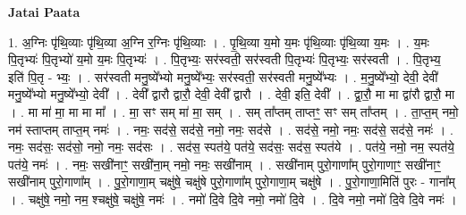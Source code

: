 \documentclass[17pt]{extarticle}
\begin{document}
\textbf{Jatai Paata} \newline

1. अ॒ग्निः पृ॑थि॒व्याः पृ॑थि॒व्या अ॒ग्नि र॒ग्निः पृ॑थि॒व्याः । . पृ॒थि॒व्या य॒मो य॒मः पृ॑थि॒व्याः पृ॑थि॒व्या य॒मः । . य॒मः पि॒तृभ्यः॑ पि॒तृभ्यो॑ य॒मो य॒मः पि॒तृभ्यः॑ । . पि॒तृभ्यः॒ सर॑स्वती॒ सर॑स्वती पि॒तृभ्यः॑ पि॒तृभ्यः॒ सर॑स्वती । . पि॒तृभ्य॒ इति॑ पि॒तृ - भ्यः॒ । . सर॑स्वती मनु॒ष्ये᳚भ्यो मनु॒ष्ये᳚भ्यः॒ सर॑स्वती॒ सर॑स्वती मनु॒ष्ये᳚भ्यः । . म॒नु॒ष्ये᳚भ्यो॒ देवी॒ देवी॑ मनु॒ष्ये᳚भ्यो मनु॒ष्ये᳚भ्यो॒ देवी᳚ । . देवी᳚ द्वारौ द्वारौ॒ देवी॒ देवी᳚ द्वारौ । . देवी॒ इति॒ देवी᳚ । . द्वा॒रौ॒ मा मा द्वा॑रौ द्वारौ॒ मा । . मा मा॑ मा॒ मा मा मा᳚ । . मा॒ सꣳ सम् मा॑ मा॒ सम् । . सम् ता᳚प्तम् ताप्तꣳ॒॒ सꣳ सम् ता᳚प्तम् । . ता॒प्त॒म् नमो॒ नम॑ स्ताप्तम् ताप्त॒म् नमः॑ । . नमः॒ सद॑से॒ सद॑से॒ नमो॒ नमः॒ सद॑से । . सद॑से॒ नमो॒ नमः॒ सद॑से॒ सद॑से॒ नमः॑ । . नमः॒ सद॑सः॒ सद॑सो॒ नमो॒ नमः॒ सद॑सः । . सद॑स॒ स्पत॑ये॒ पत॑ये॒ सद॑सः॒ सद॑स॒ स्पत॑ये । . पत॑ये॒ नमो॒ नम॒ स्पत॑ये॒ पत॑ये॒ नमः॑ । . नमः॒ सखी॑नाꣳ॒॒ सखी॑ना॒म् नमो॒ नमः॒ सखी॑नाम् । . सखी॑नाम् पुरो॒गाणा᳚म् पुरो॒गाणाꣳ॒॒ सखी॑नाꣳ॒॒ सखी॑नाम् पुरो॒गाणा᳚म् । . पु॒रो॒गाणा॒म् चक्षु॑षे॒ चक्षु॑षे पुरो॒गाणा᳚म् पुरो॒गाणा॒म् चक्षु॑षे । . पु॒रो॒गाणा॒मिति॑ पुरः - गाना᳚म् । . चक्षु॑षे॒ नमो॒ नम॒ श्चक्षु॑षे॒ चक्षु॑षे॒ नमः॑ । . नमो॑ दि॒वे दि॒वे नमो॒ नमो॑ दि॒वे । . दि॒वे नमो॒ नमो॑ दि॒वे दि॒वे नमः॑ । \newline
\end{document}
